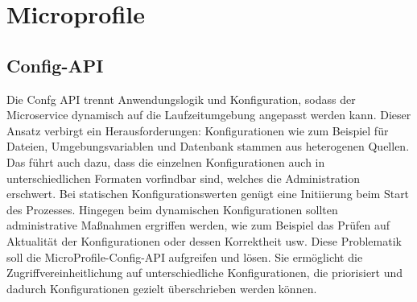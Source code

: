 \section{Microprofile}

\subsection{Config-API} 

Die Confg API trennt Anwendungslogik und Konfiguration, sodass der Microservice dynamisch auf die Laufzeitumgebung angepasst werden kann. Dieser Ansatz verbirgt ein Herausforderungen: Konfigurationen wie zum Beispiel für Dateien, Umgebungsvariablen und Datenbank stammen aus heterogenen Quellen. Das führt auch dazu, dass die einzelnen Konfigurationen auch in unterschiedlichen Formaten vorfindbar sind, welches die Administration erschwert. Bei statischen Konfigurationswerten genügt eine Initiierung beim Start des Prozesses. Hingegen beim dynamischen Konfigurationen sollten administrative Maßnahmen ergriffen werden, wie zum Beispiel das Prüfen auf Aktualität der Konfigurationen oder dessen Korrektheit usw. Diese Problematik soll die MicroProfile-Config-API aufgreifen und lösen. Sie ermöglicht die Zugriffvereinheitlichung auf unterschiedliche Konfigurationen, die priorisiert und dadurch Konfigurationen gezielt überschrieben werden können.
